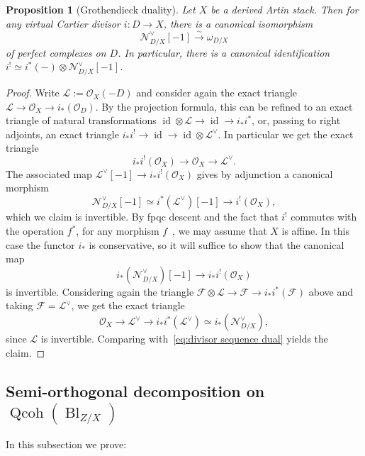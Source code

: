 \documentclass[11pt]{article}
\newtheorem{prop}[theo]{Proposition}
\theoremstyle{definition}
\numberwithin{equation}{section}
\numberwithin{figure}{section}
\numberwithin{table}{section}
\newcommand{\sF}{\ensuremath{\mathcal{F}}\xspace}
\newcommand{\sL}{\ensuremath{\mathcal{L}}\xspace}
\newcommand{\sN}{\ensuremath{\mathcal{N}}\xspace}
\newcommand{\sO}{\ensuremath{\mathcal{O}}\xspace}
\newcommand{\isoto}{\xrightarrow{\sim}}
\DeclareMathOperator{\Qcoh}{Qcoh}
\DeclareMathOperator{\Bl}{Bl}
\DeclareMathOperator{\id}{id}
\begin{document}
\begin{prop}[Grothendieck duality]\label{prop:omega_D/X}
Let $X$ be a derived Artin stack. Then for any virtual Cartier divisor $i : D \to X$, there is a canonical isomorphism
\[
\sN_{D/X}^\vee[-1] \isoto \omega_{D/X}
\]
of perfect complexes on $D$. In particular, there is a canonical identification\linebreak$i^! \simeq i^*(-) \otimes \sN_{D/X}^\vee[-1]$.
\end{prop}

\begin{proof}
Write $\sL := \sO_X(-D)$ and consider again the exact triangle $\sL \to \sO_X \to i_*(\sO_D)$. By the projection formula, this can be refined to an exact triangle of natural transformations $\id\otimes\sL \to \id \to i_*i^*$, or, passing to right adjoints, an exact triangle $i_*i^! \to \id \to \id \otimes \sL^\vee$. In particular we get the exact triangle
\begin{equation}\label{eq:divisor sequence dual}
i_*i^!(\sO_X) \to \sO_X \to \sL^\vee.
\end{equation}
The associated map $\sL^\vee[-1] \to i_*i^!(\sO_X)$ gives by adjunction a canonical morphism
\[
\sN_{D/X}^\vee[-1] \simeq i^*(\sL^\vee)[-1] \to i^!(\sO_X),
\]
which we claim is invertible. By fpqc descent and the fact that $i^!$ commutes with the operation $f^*$, for any morphism $f$~\cite[Proposition~6.4.2.1]{SAG-20180204}, we may assume that $X$ is affine. In this case the functor $i_*$ is conservative, so it will suffice to show that the canonical map
\[
i_*\left(\sN_{D/X}^\vee\right)[-1] \to i_*i^!(\sO_X)
\]
is invertible. Considering again the triangle $\sF \otimes \sL \to \sF \to i_*i^*(\sF)$ above and taking $\sF = \sL^\vee$, we get the exact triangle
\begin{equation*}
\sO_X \to \sL^\vee \to i_*i^*(\sL^\vee) \simeq i_*\left(\sN_{D/X}^\vee\right),
\end{equation*}
since $\sL$ is invertible. Comparing with~\eqref{eq:divisor sequence dual} yields the claim.
\end{proof}

\subsection{Semi-orthogonal decomposition on \texorpdfstring{$\Qcoh(\Bl_{Z/X})$}{Qcoh(Bl)}}

In this subsection we prove:
\end{document}
